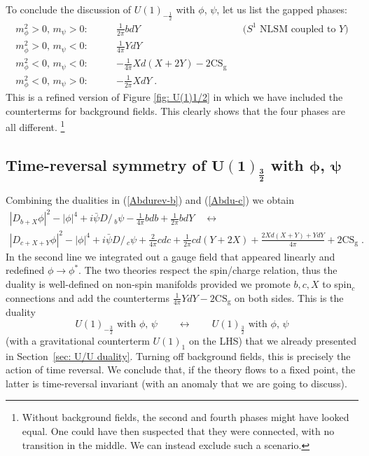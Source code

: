 \documentclass[a4paper, 12pt]{article}
\newcommand{\matht}[1]{\ensuremath{\boldsymbol{#1}}}
\numberwithin{equation}{section}
\newcommand{\Dslash}{D\!\!\!\!\slash\,}
\newcommand{\be}{\begin{equation}} \newcommand{\ee}{\end{equation}}
\newcommand{\bea}{\begin{equation} \begin{aligned}} \newcommand{\eea}{\end{aligned} \end{equation}}
\begin{document}
To conclude the discussion of $U(1)_{-\frac12}$ with $\phi$, $\psi$, let us list the gapped phases:
\bea
\label{U(1)-1/2 phi psi phases with background}
m_\phi^2>0,\, m_\psi>0: \qquad & \frac1{2\pi} bdY && \text{($S^1$ NLSM coupled to $Y$)} \\
m_\phi^2>0,\, m_\psi<0: \qquad & \frac1{4\pi} YdY \\
m_\phi^2<0,\, m_\psi<0: \qquad & - \frac1{4\pi} Xd(X+2Y) - 2\text{CS}_\text{g} \\
m_\phi^2<0,\, m_\psi>0: \qquad & - \frac1{2\pi} XdY \;.
\eea
This is a refined version of Figure \ref{fig: U(1)1/2} in which we have included the counterterms for background fields. This clearly shows that the four phases are all different.%
\footnote{Without background fields, the second and fourth phases might have looked equal. One could have then suspected that they were connected, with no transition in the middle. We can instead exclude such a scenario.}













\subsection[Time-reversal symmetry of $U(1)_\frac32$ with $\phi$, $\psi$]{Time-reversal symmetry of \matht{U(1)_\frac32} with \matht{\phi}, \matht{\psi}}
\label{sec: U(1) 3/2 time rev}

Combining the dualities in (\ref{Abdurev-b}) and (\ref{Abdu-c}) we obtain
\begin{multline}
\label{duality U(1) 3/2}
|D_{b+X}\phi|^2 - |\phi|^4 + i \bar\psi \Dslash_b \psi - \frac1{4\pi} bdb + \frac1{2\pi} bdY \quad\longleftrightarrow \\
|D_{c+X+Y}\phi|^2 - |\phi|^4 + i \bar\psi \Dslash_c\psi + \frac2{4\pi} cdc + \frac1{2\pi} cd(Y+2X) + \frac{2Xd(X+Y) + YdY}{4\pi} + 2\text{CS}_\text{g} \;.
\end{multline}
In the second line we integrated out a gauge field that appeared linearly and redefined \mbox{$\phi \to \phi^*$}. The two theories respect the spin/charge relation, thus the duality is well-defined on non-spin manifolds provided we promote $b,c,X$ to spin$_c$ connections and add the counterterms $\frac1{4\pi} YdY - 2\text{CS}_\text{g}$ on both sides. This is the duality
\be
U(1)_{-\frac32} \text{ with $\phi$, $\psi$} \qquad\longleftrightarrow\qquad U(1)_\frac32 \text{ with $\phi$, $\psi$}
\ee
(with a gravitational counterterm $U(1)_1$ on the LHS) that we already presented in Section~\ref{sec: U/U duality}. Turning off background fields, this is precisely the action of time reversal. We conclude that, if the theory flows to a fixed point, the latter is time-reversal invariant (with an anomaly that we are going to discuss).
\end{document}
